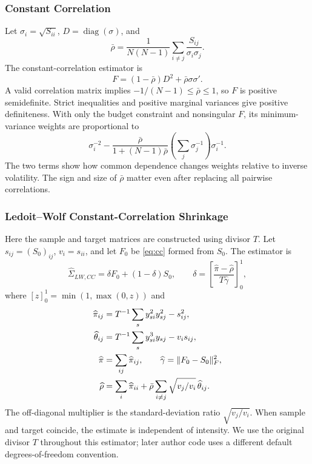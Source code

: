 \documentclass[letterpaper,journal]{IEEEtran}
\begin{document}
\subsubsection{Constant Correlation}
Let $\sigma_i=\sqrt{S_{ii}}$, $D=\operatorname{diag}(\sigma)$, and
\begin{equation}
 \bar\rho=\frac{1}{N(N-1)}\sum_{i\ne j}\frac{S_{ij}}{\sigma_i\sigma_j}.
\end{equation}
The constant-correlation estimator \cite{constantcorr} is
\begin{equation}\label{eq:cc}
 F=(1-\bar\rho)D^2+\bar\rho\sigma\sigma'.
\end{equation}
A valid correlation matrix implies $-1/(N-1)\leq\bar\rho\leq1$, so $F$ is positive semidefinite. Strict inequalities and positive marginal variances give positive definiteness. With only the budget constraint and nonsingular $F$, its minimum-variance weights are proportional to
\begin{equation}
 \sigma_i^{-2}-\frac{\bar\rho}{1+(N-1)\bar\rho}
 \left(\sum_j\sigma_j^{-1}\right)\sigma_i^{-1}.
\end{equation}
The two terms show how common dependence changes weights relative to inverse volatility. The sign and size of $\bar\rho$ matter even after replacing all pairwise correlations.

\subsubsection{Ledoit--Wolf Constant-Correlation Shrinkage}
Here the sample and target matrices are constructed using divisor $T$. Let $s_{ij}=(S_0)_{ij}$, $v_i=s_{ii}$, and let $F_0$ be \eqref{eq:cc} formed from $S_0$. The estimator \cite{lw} is
\begin{equation}
 \widehat\Sigma_{LW,CC}=\delta F_0+(1-\delta)S_0,\qquad
 \delta=\left[\frac{\widehat\pi-\widehat\rho}{T\widehat\gamma}\right]_0^1,
\end{equation}
where $[z]_0^1=\min(1,\max(0,z))$ and
\begin{align}
 \widehat\pi_{ij}&=T^{-1}\sum_s y_{si}^2y_{sj}^2-s_{ij}^2,\notag\\
 \widehat\theta_{ij}&=T^{-1}\sum_s y_{si}^3y_{sj}-v_i s_{ij},\notag\\
 \widehat\pi&=\sum_{ij}\widehat\pi_{ij},\qquad
 \widehat\gamma=\|F_0-S_0\|_F^2,\\
 \widehat\rho&=\sum_i\widehat\pi_{ii}
 +\bar\rho\sum_{i\ne j}\sqrt{v_j/v_i}\,\widehat\theta_{ij}.\notag
\end{align}
The off-diagonal multiplier is the standard-deviation ratio $\sqrt{v_j/v_i}$. When sample and target coincide, the estimate is independent of intensity. We use the original divisor $T$ throughout this estimator; later author code uses a different default degrees-of-freedom convention.
\end{document}

